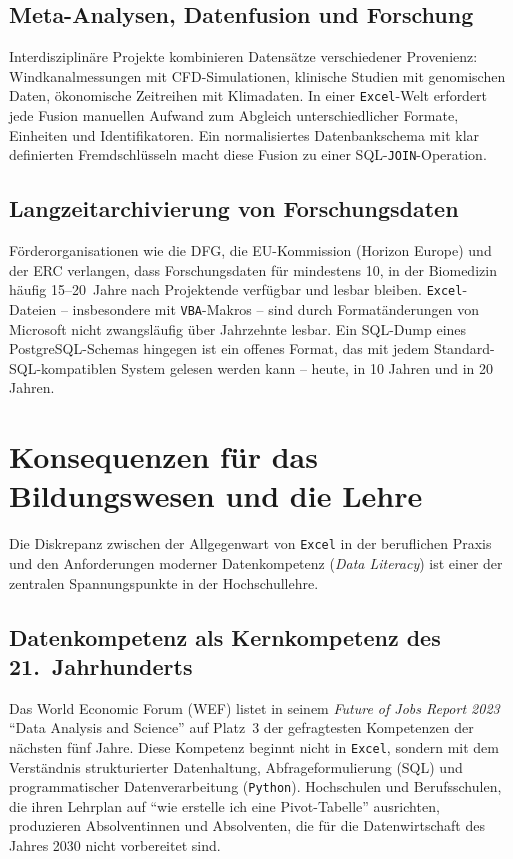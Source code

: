 \documentclass[12pt,a4paper]{report}
\theoremstyle{definition}
\theoremstyle{remark}
\newcommand{\excel}{\texttt{Excel}}
\newcommand{\vba}{\texttt{VBA}}
\newcommand{\py}{\texttt{Python}}
\newcommand{\code}[1]{\texttt{#1}}
\begin{document}
\subsection{Meta-Analysen, Datenfusion und Forschung}

Interdisziplinäre Projekte kombinieren Datensätze verschiedener
Provenienz: Windkanalmessungen mit CFD-Simulationen, klinische
Studien mit genomischen Daten, ökonomische Zeitreihen mit Klimadaten.
In einer \excel-Welt erfordert jede Fusion manuellen Aufwand zum
Abgleich unterschiedlicher Formate, Einheiten und Identifikatoren.
Ein normalisiertes Datenbankschema mit klar definierten Fremdschlüsseln
macht diese Fusion zu einer SQL-\code{JOIN}-Operation.

\subsection{Langzeitarchivierung von Forschungsdaten}

Förderorganisationen wie die DFG, die EU-Kommission (Horizon Europe)
und der ERC verlangen, dass Forschungsdaten für mindestens 10,
in der Biomedizin häufig 15--20~Jahre nach Projektende verfügbar und
lesbar bleiben.
\excel-Dateien -- insbesondere mit \vba-Makros -- sind durch
Formatänderungen von Microsoft nicht zwangsläufig über Jahrzehnte
lesbar.
Ein SQL-Dump eines PostgreSQL-Schemas hingegen ist ein offenes Format,
das mit jedem Standard-SQL-kompatiblen System gelesen werden kann --
heute, in 10 Jahren und in 20 Jahren.

\section{Konsequenzen für das Bildungswesen und die Lehre}

Die Diskrepanz zwischen der Allgegenwart von \excel{} in der beruflichen
Praxis und den Anforderungen moderner Datenkompetenz
(\textit{Data Literacy}) ist einer der zentralen Spannungspunkte
in der Hochschullehre.

\subsection{Datenkompetenz als Kernkompetenz des 21.\ Jahrhunderts}

Das World Economic Forum (WEF) listet in seinem
\textit{Future of Jobs Report 2023} ``Data Analysis and Science''
auf Platz~3 der gefragtesten Kompetenzen der nächsten fünf Jahre.
Diese Kompetenz beginnt nicht in \excel{}, sondern mit dem Verständnis
strukturierter Datenhaltung, Abfrageformulierung (SQL) und
programmatischer Datenverarbeitung (\py).
Hochschulen und Berufsschulen, die ihren Lehrplan auf
``wie erstelle ich eine Pivot-Tabelle'' ausrichten, produzieren
Absolventinnen und Absolventen, die für die Datenwirtschaft
des Jahres 2030 nicht vorbereitet sind.
\end{document}
